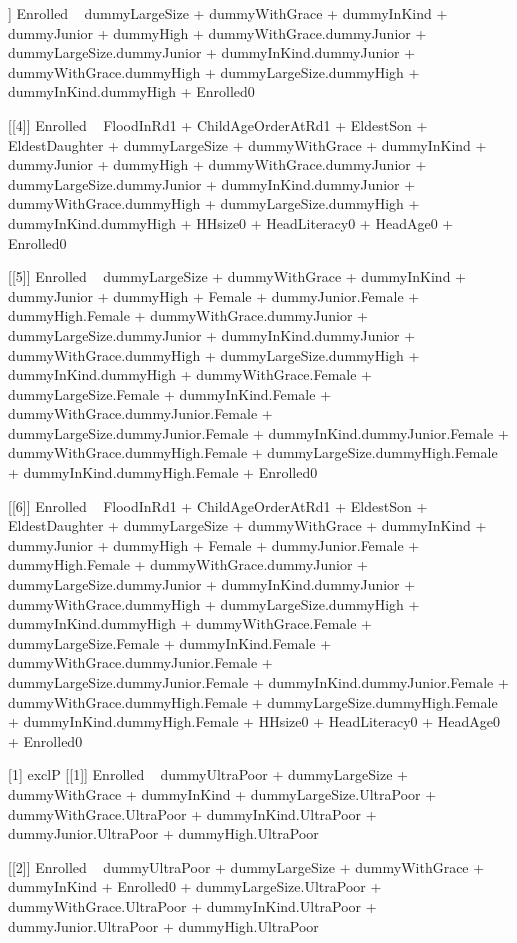 \begin{Schunk}
\begin{Soutput}
[[3]]
Enrolled ~ dummyLargeSize + dummyWithGrace + dummyInKind + dummyJunior + 
    dummyHigh + dummyWithGrace.dummyJunior + dummyLargeSize.dummyJunior + 
    dummyInKind.dummyJunior + dummyWithGrace.dummyHigh + dummyLargeSize.dummyHigh + 
    dummyInKind.dummyHigh + Enrolled0

[[4]]
Enrolled ~ FloodInRd1 + ChildAgeOrderAtRd1 + EldestSon + EldestDaughter + 
    dummyLargeSize + dummyWithGrace + dummyInKind + dummyJunior + 
    dummyHigh + dummyWithGrace.dummyJunior + dummyLargeSize.dummyJunior + 
    dummyInKind.dummyJunior + dummyWithGrace.dummyHigh + dummyLargeSize.dummyHigh + 
    dummyInKind.dummyHigh + HHsize0 + HeadLiteracy0 + HeadAge0 + 
    Enrolled0

[[5]]
Enrolled ~ dummyLargeSize + dummyWithGrace + dummyInKind + dummyJunior + 
    dummyHigh + Female + dummyJunior.Female + dummyHigh.Female + 
    dummyWithGrace.dummyJunior + dummyLargeSize.dummyJunior + 
    dummyInKind.dummyJunior + dummyWithGrace.dummyHigh + dummyLargeSize.dummyHigh + 
    dummyInKind.dummyHigh + dummyWithGrace.Female + dummyLargeSize.Female + 
    dummyInKind.Female + dummyWithGrace.dummyJunior.Female + 
    dummyLargeSize.dummyJunior.Female + dummyInKind.dummyJunior.Female + 
    dummyWithGrace.dummyHigh.Female + dummyLargeSize.dummyHigh.Female + 
    dummyInKind.dummyHigh.Female + Enrolled0

[[6]]
Enrolled ~ FloodInRd1 + ChildAgeOrderAtRd1 + EldestSon + EldestDaughter + 
    dummyLargeSize + dummyWithGrace + dummyInKind + dummyJunior + 
    dummyHigh + Female + dummyJunior.Female + dummyHigh.Female + 
    dummyWithGrace.dummyJunior + dummyLargeSize.dummyJunior + 
    dummyInKind.dummyJunior + dummyWithGrace.dummyHigh + dummyLargeSize.dummyHigh + 
    dummyInKind.dummyHigh + dummyWithGrace.Female + dummyLargeSize.Female + 
    dummyInKind.Female + dummyWithGrace.dummyJunior.Female + 
    dummyLargeSize.dummyJunior.Female + dummyInKind.dummyJunior.Female + 
    dummyWithGrace.dummyHigh.Female + dummyLargeSize.dummyHigh.Female + 
    dummyInKind.dummyHigh.Female + HHsize0 + HeadLiteracy0 + 
    HeadAge0 + Enrolled0

[1] exclP
[[1]]
Enrolled ~ dummyUltraPoor + dummyLargeSize + dummyWithGrace + 
    dummyInKind + dummyLargeSize.UltraPoor + dummyWithGrace.UltraPoor + 
    dummyInKind.UltraPoor + dummyJunior.UltraPoor + dummyHigh.UltraPoor

[[2]]
Enrolled ~ dummyUltraPoor + dummyLargeSize + dummyWithGrace + 
    dummyInKind + Enrolled0 + dummyLargeSize.UltraPoor + dummyWithGrace.UltraPoor + 
    dummyInKind.UltraPoor + dummyJunior.UltraPoor + dummyHigh.UltraPoor


\end{Soutput}
\end{Schunk}
